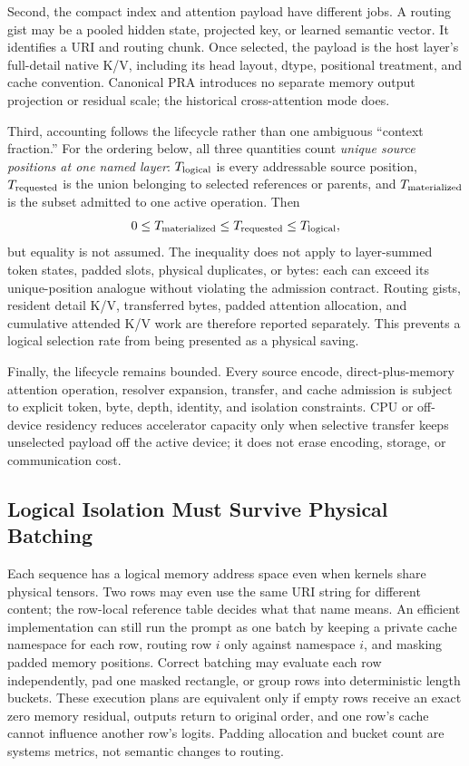 \documentclass[11pt]{article}
\begin{document}
Second, the compact index and attention payload have different jobs. A routing gist may be a
pooled hidden state, projected key, or learned semantic vector. It identifies a URI and routing
chunk. Once selected, the payload is the host layer's full-detail native K/V, including its
head layout, dtype, positional treatment, and cache convention. Canonical PRA introduces no
separate memory output projection or residual scale; the historical cross-attention mode does.

Third, accounting follows the lifecycle rather than one ambiguous ``context fraction.'' For
the ordering below, all three quantities count \emph{unique source positions at one named
layer}: $T_{\rm logical}$ is every addressable source position, $T_{\rm requested}$ is the
union belonging to selected references or parents, and $T_{\rm materialized}$ is the subset
admitted to one active operation. Then
\begin{equation}
0 \le T_{\rm materialized} \le T_{\rm requested} \le T_{\rm logical},
\end{equation}
but equality is not assumed. The inequality does not apply to layer-summed token states,
padded slots, physical duplicates, or bytes: each can exceed its unique-position analogue
without violating the admission contract. Routing gists, resident detail K/V, transferred
bytes, padded attention allocation, and cumulative attended K/V work are therefore reported
separately. This prevents a logical selection rate from being presented as a physical saving.

Finally, the lifecycle remains bounded. Every source encode, direct-plus-memory attention
operation, resolver expansion, transfer, and cache admission is subject to explicit token,
byte, depth, identity, and isolation constraints. CPU or off-device residency reduces accelerator
capacity only when selective transfer keeps unselected payload off the active device; it does
not erase encoding, storage, or communication cost.

\subsection{Logical Isolation Must Survive Physical Batching}

Each sequence has a logical memory address space even when kernels share physical tensors.
Two rows may even use the same URI string for different content; the row-local reference
table decides what that name means.  An efficient implementation can still run the
prompt as one batch by keeping a private cache namespace for each row, routing row $i$
only against namespace $i$, and masking padded memory positions. Correct batching may
evaluate each row independently, pad one masked rectangle, or group rows into deterministic length buckets. These execution plans are equivalent only if empty rows receive an exact zero memory residual, outputs return to original order, and one row's cache cannot influence another row's logits. Padding allocation and bucket count are systems metrics, not semantic changes to routing.
\end{document}
